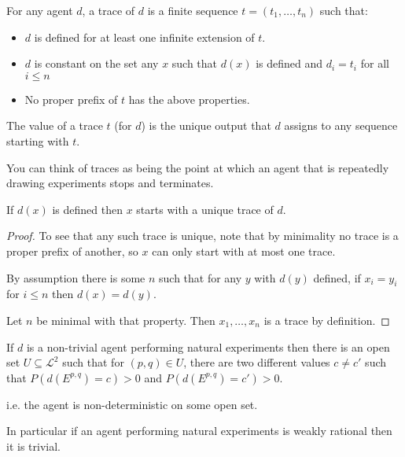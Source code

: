 \begin{definition}
For any agent $d$, a trace of $d$ is a finite sequence $t = (t_1, \ldots, t_n)$
such that:

\begin{itemize}
\item $d$ is defined for at least one infinite extension of $t$.
\item $d$ is constant on the set any $x$ such that $d(x)$ is defined
and $d_i = t_i$ for all $i \leq n$
\item No proper prefix of $t$ has the above properties.
\end{itemize}

The value of a trace $t$ (for $d$) is the unique output that $d$ assigns to any
sequence starting with $t$.
\end{definition}

You can think of traces as being the point at which an agent that is repeatedly
drawing experiments stops and terminates.

\begin{proposition}
If $d(x)$
is defined then $x$
starts with a unique trace of $d$.
\end{proposition}

\begin{proof}
To see that any such trace is unique, note that by minimality no
trace is a proper prefix of another, so $x$
can only start with at most one trace.

By assumption there is some $n$
such that for any $y$
with $d(y)$
defined, if $x_i = y_i$
for $i \leq n$
then $d(x) = d(y)$.

Let $n$
be minimal with that property. Then $x_1, \ldots, x_n$
is a trace by definition.
\end{proof}

\begin{theorem}
If $d$ is a non-trivial agent performing natural experiments
then there is an open set $U \subseteq \mathcal{L}^2$
such that for $(p, q) \in U$,
there are two different values $c \neq c'$
such that $P(d(E^{p, q}) = c) > 0$
and $P(d(E^{p, q}) = c') > 0$.

i.e. the agent is non-deterministic on some open set.

In particular if an agent performing natural experiments is
weakly rational then it is trivial.
\end{theorem}

